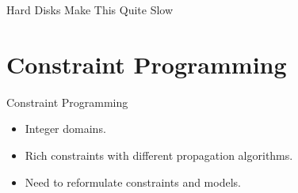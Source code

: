 \documentclass{beamer}
\begin{document}
\begin{frame}{Hard Disks Make This Quite Slow}
    \begin{center}
    \end{center}
\end{frame}

\section{Constraint Programming}

\begin{frame}{Constraint Programming}
    \begin{itemize}
        \item Integer domains.
        \item Rich constraints with different propagation algorithms.
        \item Need to reformulate constraints and models.
    \end{itemize}
\end{frame}
\end{document}
